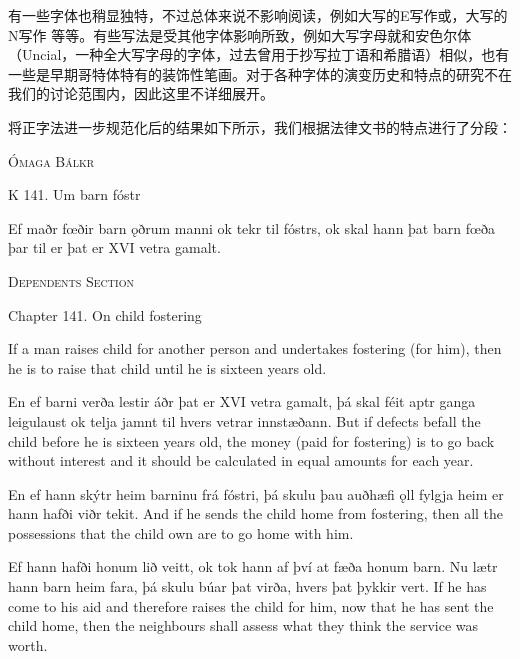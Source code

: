 有一些字体也稍显独特，不过总体来说不影响阅读，例如大写的E写作\Eunical 或\Eclosedunical ，大写的N写作{\Large{\nwithdescender}} 等等。有些写法是受其他字体影响所致，例如大写字母就和安色尔体（Uncial，一种全大写字母的字体，过去曾用于抄写拉丁语和希腊语）相似，也有一些是早期哥特体特有的装饰性笔画。对于各种字体的演变历史和特点的研究不在我们的讨论范围内，因此这里不详细展开。

将正字法进一步规范化后的结果如下所示，我们根据法律文书的特点进行了分段：
\begin{paracol}{2}
    \begin{center}
        \textsc{Ómaga Bálkr}

        K 141. Um barn fóstr
    \end{center}

    Ef maðr fœðir barn ǫðrum manni ok tekr til fóstrs, ok skal hann þat barn fœða þar til er þat er XVI vetra gamalt.
    \switchcolumn
    \begin{center}
        \textsc{Dependents Section}

        Chapter 141. On child fostering
    \end{center}

    If a man raises child for another person and undertakes fostering (for him), then he is to raise that child until he is sixteen years old.
\end{paracol}
\begin{paracol}{2}
    En ef barni verða lestir áðr þat er XVI vetra gamalt, þá skal féit aptr ganga leigulaust ok telja jamnt til hvers vetrar innstæðann.
    \switchcolumn
    But if defects befall the child before he is sixteen years old, the money (paid for fostering) is to go back without interest and it should be calculated in equal amounts for each year.
\end{paracol}

\begin{paracol}{2}
    En ef hann skýtr heim barninu frá fóstri, þá skulu þau auðhæfi ǫll fylgja heim er hann hafði viðr tekit.
    \switchcolumn
    And if he sends the child home from fostering, then all the possessions that the child own are to go home with him.
\end{paracol}
\begin{paracol}{2}
    Ef hann hafði honum lið veitt, ok tok hann af því at fæða honum barn. Nu lætr hann barn heim fara, þá skulu búar þat virða, hvers þat þykkir vert.
    \switchcolumn
    If he has come to his aid and therefore raises the child for him, now that he has sent the child home, then the neighbours shall assess what they think the service was worth.
\end{paracol}

